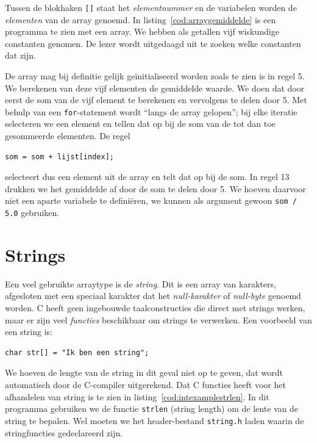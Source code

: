 Tussen de blokhaken \texttt{[]}\indexop{[]} staat het \textsl{elementnummer} en de variabelen worden de \textsl{elementen} van de array genoemd. In listing~\ref{cod:arraygemiddelde} is een programma te zien met een array. We hebben als getallen vijf wiskundige constanten genomen. De lezer wordt uitgedaagd uit te zoeken welke constanten dat zijn.


De array mag bij definitie gelijk geïnitialiseerd worden zoals te zien is in regel 5. We berekenen van deze vijf elementen de gemiddelde waarde. We doen dat door eerst de som van de vijf element te berekenen en vervolgens te delen door 5. Met behulp van een \texttt{for}-statement wordt ``langs de array gelopen''; bij elke iteratie selecteren we een element en tellen dat op bij de som van de tot dan toe gesommeerde elementen. De regel

\begin{lstlisting}[style=lstoneline]
som = som + lijst[index];
\end{lstlisting}

selecteert dus een element uit de array en telt dat op bij de som. In regel 13 drukken we het gemiddelde af door de som te delen door 5. We hoeven daarvoor niet een aparte variabele te definiëren, we kunnen als argument gewoon \texttt{som / 5.0} gebruiken.


\section{Strings}
Een veel gebruikte arraytype is de \textsl{string}. Dit is een array van karakters, afgesloten met een speciaal karakter dat het \textsl{null-karakter} of \textsl{null-byte} genoemd worden. C heeft geen ingebouwde taalconstructies die direct met strings werken, maar er zijn veel \textsl{functies} beschikbaar om strings te verwerken. Een voorbeeld van een string is:

\begin{lstlisting}[caption=Voorbeeld van een string.]
char str[] = "Ik ben een string";
\end{lstlisting}

We hoeven de lengte van de string in dit geval niet op te geven, dat wordt automatisch door de C-compiler uitgerekend. Dat C functies heeft voor het afhandelen van string is te zien in listing~\ref{cod:intexamplestrlen}. In dit programma gebruiken we de functie \lstinline|strlen| (string length) om de lente van de string te bepalen. Wel moeten we het header-bestand \lstinline|string.h| laden waarin de stringfuncties gedeclareerd zijn.

